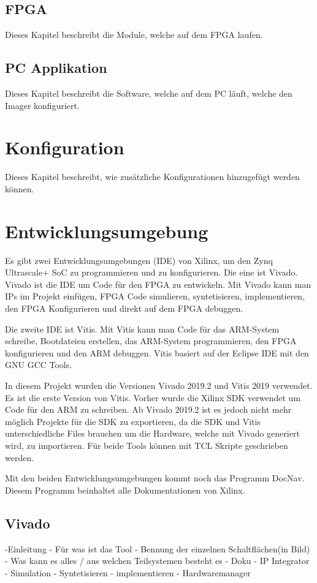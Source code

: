 \documentclass{article}
\begin{document}
\subsection{FPGA}
Dieses Kapitel beschreibt die Module, welche auf dem FPGA laufen.
\subsection{PC Applikation}
Dieses Kapitel beschreibt die Software, welche auf dem PC läuft, welche den Imager konfiguriert.


\section{Konfiguration}
Dieses Kapitel beschreibt, wie zusätzliche Konfigurationen hinzugefügt werden können.

\section{Entwicklungsumgebung}
Es gibt zwei Entwicklungsumgebungen (IDE) von Xilinx, um den Zynq Ultrascale+ SoC zu programmieren und zu konfigurieren. Die eine ist Vivado. Vivado ist die IDE um Code für den FPGA zu entwickeln. Mit Vivado kann man IPs im Projekt einfügen, FPGA Code simulieren, syntetisieren, implementieren, den FPGA Konfigurieren und direkt auf dem FPGA debuggen.

Die zweite IDE ist Vitis. Mit Vitis kann man Code für das ARM-System schreibe, Bootdateien erstellen, das ARM-System programmieren, den FPGA konfigurieren und den ARM debuggen. Vitis basiert auf der Eclipse IDE mit den GNU GCC Tools.

In diesem Projekt wurden die Versionen Vivado 2019.2 und Vitis 2019 verwendet. Es ist die erste Version von Vitis. Vorher wurde die Xilinx SDK verwendet um Code für den ARM zu schreiben. Ab Vivado 2019.2 ist es jedoch nicht mehr möglich Projekte für die SDK zu exportieren, da die SDK und Vitis unterschiedliche Files brauchen um die Hardware, welche mit Vivado generiert wird, zu importieren. Für beide Tools können mit TCL Skripte geschrieben werden.

Mit den beiden Entwicklungsumgebungen kommt noch das Programm DocNav. Diesem Programm beinhaltet alle Dokumentationen von Xilinx.
\subsection{Vivado}
-Einleitung
    - Für was ist das Tool
    - Bennung der einzelnen Schaltflächen(in Bild)
    - Was kann es alles / aus welchen Teilsystemen besteht es
    - Doku
- IP Integrator
- Simulation
- Syntetisieren
- implementieren
- Hardwaremanager
\end{document}
